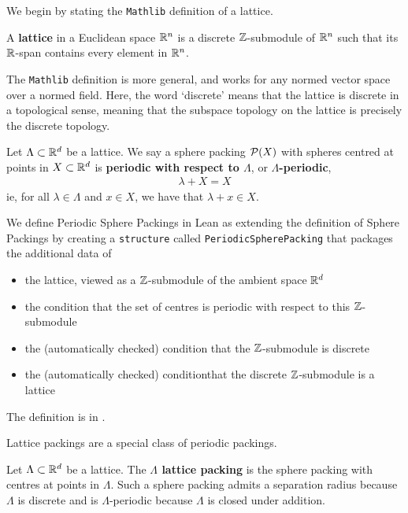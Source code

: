We begin by stating the \verb|Mathlib| definition of a lattice.

\begin{boxdefinition}[Lattice]
    A \textbf{lattice} in a Euclidean space $\mathbb{R}^n$ is a discrete $\mathbb{Z}$-submodule of $\mathbb{R}^n$ such that its $\mathbb{R}$-span contains every element in $\mathbb{R}^n$.
\end{boxdefinition}

The \verb|Mathlib| definition is more general, and works for any normed vector space over a normed field. Here, the word `discrete' means that the lattice is discrete in a topological sense, meaning that the subspace topology on the lattice is precisely the discrete topology.

\begin{boxdefinition}
    Let $\Lambda \subset \mathbb{R}^d$ be a lattice. We say a sphere packing $\mathcal{P}(X)$ with spheres centred at points in $X \subset \mathbb{R}^d$ is \textbf{periodic with respect to $\Lambda$}, or \textbf{$\Lambda$-periodic},
    \begin{align*}
        \lambda + X = X
    \end{align*}
    ie, for all $\lambda \in \Lambda$ and $x \in X$, we have that $\lambda + x \in X$.
\end{boxdefinition}

We define Periodic Sphere Packings in Lean as extending the definition of Sphere Packings by creating a \verb|structure| called \verb|PeriodicSpherePacking| that packages the additional data of
\begin{itemize}
    \item the lattice, viewed as a $\mathbb{Z}$-submodule of the ambient space $\mathbb{R}^d$
    \item the condition that the set of centres is periodic with respect to this $\mathbb{Z}$-submodule
    \item the (automatically checked) condition\footnotemark{} that the $\mathbb{Z}$-submodule is discrete
    \item the (automatically checked) condition\footnotemark[\value{footnote}] that the discrete $\mathbb{Z}$-submodule is a lattice
\end{itemize}
The definition is in \cite[\texttt{SpherePacking.Basic.SpherePacking}]{documentation}.

Lattice packings are a special class of periodic packings.

\begin{boxdefinition}
    Let $\Lambda \subset \mathbb{R}^d$ be a lattice. The \textbf{$\Lambda$ lattice packing} is the sphere packing with centres at points in $\Lambda$. Such a sphere packing admits a separation radius because $\Lambda$ is discrete and is $\Lambda$-periodic because $\Lambda$ is closed under addition.
\end{boxdefinition}

